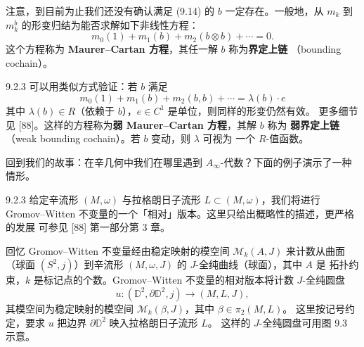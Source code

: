 注意，到目前为止我们还没有确认满足 (9.14) 的 $b$ 一定存在。一般地，从 $m_k$ 到
$m_k^b$ 的形变归结为能否求解如下非线性方程：
\begin{equation*}
\tag*{(9.16)}
  m_0(1)+m_1(b)+m_2(b\otimes b)+\cdots=0.
\end{equation*}
这个方程称为 \textbf{Maurer--Cartan 方程}，其任一解 $b$ 称为\textbf{界定上链}
（bounding cochain）。

\begin{wrem}{9.2.3}
  可以用类似方式验证：若 $b$ 满足
  \begin{equation*}
    m_0(1)+m_1(b)+m_2(b,b)+\cdots=\lambda(b)\cdot e
  \end{equation*}
  其中 $\lambda(b)\in R$（依赖于 $b$），$e\in C^1$ 是单位，则同样的形变仍然有效。
  更多细节见 [88]。这样的方程称为\textbf{弱 Maurer--Cartan 方程}，其解 $b$ 称为
  \textbf{弱界定上链}（weak bounding cochain）。若 $b$ 变动，则 $\lambda$ 可视为
  一个 $R$-值函数。
\end{wrem}

回到我们的故事：在辛几何中我们在哪里遇到 $A_\infty$-代数？下面的例子演示了一种情形。

\begin{wexam}{9.2.3}
  给定辛流形 $(M,\omega)$ 与拉格朗日子流形 $L\subset(M,\omega)$，我们将进行
  Gromov--Witten 不变量的一个「相对」版本。这里只给出概略性的描述，更严格的发展
  可参见 [88] 第一部分第 3 章。

  回忆 Gromov--Witten 不变量经由稳定映射的模空间 $\mathcal M_k(A,J)$ 来计数从曲面
  （球面 $(S^2,j)$）到辛流形 $(M,\omega,J)$ 的 $J$-全纯曲线（球面），其中 $A$ 是
  拓扑约束，$k$ 是标记点的个数。Gromov--Witten 不变量的相对版本将计数
  $J$-全纯圆盘
  \begin{equation*}
    u\colon(\mathbb{D}^2,\partial\mathbb{D}^2,j)\to(M,L,J),
  \end{equation*}
  其模空间为稳定映射的模空间 $\mathcal M_k(\beta,J)$，其中 $\beta\in\pi_2(M,L)$。
  这里按记号约定，要求 $u$ 把边界 $\partial\mathbb{D}^2$ 映入拉格朗日子流形 $L$。
  这样的 $J$-全纯圆盘可用图 9.3 示意。
\end{wexam}

